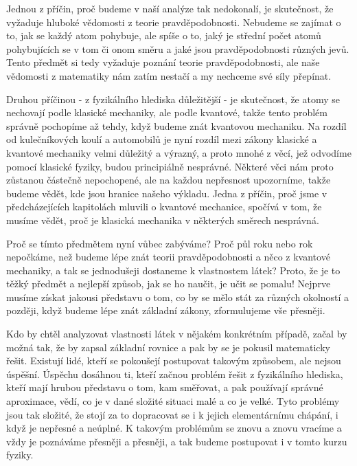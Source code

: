     Jednou z příčin, proč budeme v naší analýze tak nedokonalí, je skutečnost, že vyžaduje hluboké
    vědomosti z teorie pravděpodobnosti. Nebudeme se zajímat o to, jak se každý atom pohybuje, ale
    spíše o to, jaký je střední počet atomů pohybujících se v tom či onom směru a jaké jsou
    pravděpodobnosti různých jevů. Tento předmět si tedy vyžaduje poznání teorie pravděpodobnosti,
    ale naše vědomosti z matematiky nám zatím nestačí a my nechceme své síly přepínat.
    
    Druhou příčinou - z fyzikálního hlediska důležitější - je skutečnost, že atomy se nechovají
    podle klasické mechaniky, ale podle kvantové, takže tento problém správně pochopíme až tehdy,
    když budeme znát kvantovou mechaniku. Na rozdíl od kulečníkových koulí a automobilů je nyní
    rozdíl mezi zákony klasické a kvantové mechaniky velmi důležitý a výrazný, a proto mnohé z věcí,
    jež odvodíme pomocí klasické fyziky, budou principiálně nesprávné. Některé věci nám proto
    zůstanou částečně nepochopené, ale na každou nepřesnost upozorníme, takže budeme vědět, kde
    jsou hranice našeho výkladu. Jedna z příčin, proč jsme v předcházejících kapitolách mluvili o
    kvantové mechanice, spočívá v tom, že musíme vědět, proč je klasická mechanika v některých
    směrech nesprávná.    
    
    Proč se tímto předmětem nyní vůbec zabýváme? Proč půl roku nebo rok nepočkáme, než budeme lépe
    znát teorii pravděpodobnosti a něco z kvantové mechaniky, a tak se jednodušeji dostaneme k
    vlastnostem látek? Proto, že je to těžký předmět a nejlepší způsob, jak se ho naučit, je učit se
    pomalu! Nejprve musíme získat jakousi představu o tom, co by se mělo stát za různých okolností a
    později, když budeme lépe znát základní zákony, zformulujeme vše přesněji.
    
    Kdo by chtěl analyzovat vlastnosti látek v nějakém konkrétním případě, začal by možná tak, že by
    zapsal základní rovnice a pak by se je pokusil matematicky řešit. Existují lidé, kteří se
    pokoušejí postupovat takovým způsobem, ale nejsou úspěšní. Úspěchu dosáhnou ti, kteří začnou
    problém řešit z fyzikálního hlediska, kteří mají hrubou představu o tom, kam směřovat, a pak
    používají správné aproximace, vědí, co je v dané složité situaci malé a co je velké. Tyto
    problémy jsou tak složité, že stojí za to dopracovat se i k jejich elementárnímu chápání, i když
    je nepřesné a neúplné. K takovým problémům se znovu a znovu vracíme a vždy je poznáváme přesněji
    a přesněji, a tak budeme postupovat i v tomto kurzu fyziky.
    
